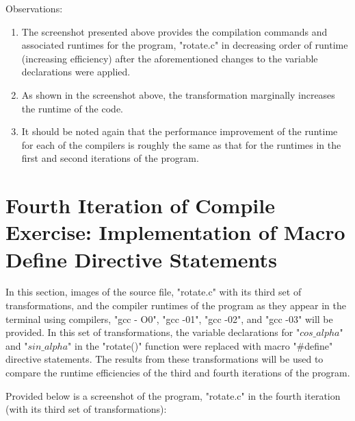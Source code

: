 \documentclass{article}
\begin{document}

Observations:
\begin{enumerate}
    \label{sec:math}
    \item The screenshot presented above provides the compilation commands and associated runtimes for the program, "rotate.c" in decreasing order of runtime (increasing efficiency) after the aforementioned changes to the variable declarations were applied. 
    \item As shown in the screenshot above, the transformation marginally increases the runtime of the code. 
    \item It should be noted again that the performance improvement of the runtime for each of the compilers is roughly the same as that for the runtimes in the first and second iterations of the program. 
    
\end{enumerate}
\pagebreak


\section{Fourth Iteration of Compile Exercise: Implementation of Macro Define Directive Statements}

In this section, images of the source file, "rotate.c" with its third set of transformations, and the compiler runtimes of the program as they appear in the terminal using compilers, "gcc - O0", "gcc -01", "gcc -02", and "gcc -03" will be provided. In this set of transformations, the variable declarations for "$cos\_alpha$" and "$sin\_alpha$" in the "rotate()" function were replaced with macro "#define" directive statements. The results from these transformations will be used to compare the runtime efficiencies of the third and fourth iterations of the program.

Provided below is a screenshot of the program, "rotate.c" in the fourth iteration (with its third set of transformations):

\end{document}
